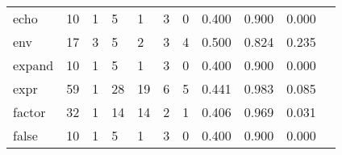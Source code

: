 \begin{longtable}{lp{1.20cm}p{1.20cm}p{1.20cm}p{1.20cm}p{1.20cm}p{1.20cm}p{1.20cm}p{1.20cm}p{1.20cm}p{1.20cm}}
echo      &                                    10 &                                                  1 &                                                  5 &                                                  1 &                                                  3 &                                                  0 &                                         0.400 &                                              0.900 &                                              0.000 \\
env       &                                    17 &                                                  3 &                                                  5 &                                                  2 &                                                  3 &                                                  4 &                                         0.500 &                                              0.824 &                                              0.235 \\
expand    &                                    10 &                                                  1 &                                                  5 &                                                  1 &                                                  3 &                                                  0 &                                         0.400 &                                              0.900 &                                              0.000 \\
expr      &                                    59 &                                                  1 &                                                 28 &                                                 19 &                                                  6 &                                                  5 &                                         0.441 &                                              0.983 &                                              0.085 \\
factor    &                                    32 &                                                  1 &                                                 14 &                                                 14 &                                                  2 &                                                  1 &                                         0.406 &                                              0.969 &                                              0.031 \\
false     &                                    10 &                                                  1 &                                                  5 &                                                  1 &                                                  3 &                                                  0 &                                         0.400 &                                              0.900 &                                              0.000 \\

\end{longtable}
